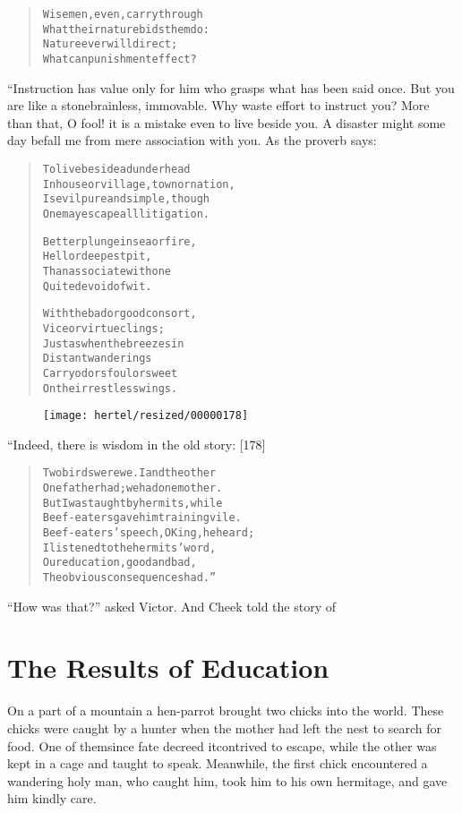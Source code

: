 \documentclass[article, twoside, 10pt]{memoir}
\renewenvironment{verbatim}{%
\begin{quote}%
\vskip -10pt%
\begin{alltt}\normalfont\small}{\end{alltt}%
\end{quote}%
\vskip -10pt
} %
\begin{document}
\begin{verbatim}
Wise men, even, carry through
What their nature bids them do:
Nature ever will direct;
What can punishment effect?
\end{verbatim}
“Instruction has value only for him who grasps what has been said
once. But you are like a stone{\textemdash}brainless, immovable. Why waste
effort to instruct you? More than that, O fool! it is a mistake
even to live beside you. A disaster might some day befall me from
mere association with you. As the proverb says:

\begin{verbatim}
To live beside a dunderhead
    In house or village, town or nation,
Is evil pure and simple, though
    One may escape all litigation.

Better plunge in sea or fire,
    Hell or deepest pit,
Than associate with one
    Quite devoid of wit.

With the bad or good consort,
    Vice or virtue clings;
Just as when the breezes in
    Distant wanderings
Carry odors foul or sweet
    On their restless wings.
\end{verbatim}
\begin{figure}[p]\texttt{[image: hertel/resized/00000178]}\end{figure}“Indeed, there is wisdom in the old story: [178]

\begin{verbatim}
Two birds were we. I and the other
One father had; we had one mother.
But I was taught by hermits, while
Beef-eaters gave him training vile.
Beef-eaters' speech, O King, he heard;
I listened to the hermits' word,
Our education, good and bad,
The obvious consequences had.”
\end{verbatim}
``How was that?'' asked Victor. And Cheek told the story of

\chapter{The Results of Education}

On a part of a mountain a hen-parrot brought two chicks into the
world. These chicks were caught by a hunter when the mother had
left the nest to search for food. One of them{\textemdash}since fate decreed
it{\textemdash}contrived to escape, while the other was kept in a cage and
taught to speak. Meanwhile, the first chick encountered a wandering
holy man, who caught him, took him to his own hermitage, and gave
him kindly care.
\end{document}
